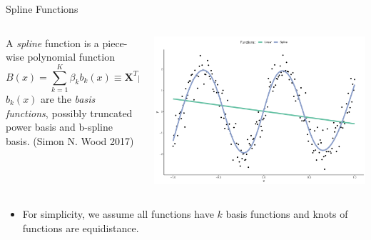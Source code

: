 \documentclass[
  ignorenonframetext,
  aspectratio=169]{beamer}
\providecommand{\tightlist}{%
  \setlength{\itemsep}{0pt}\setlength{\parskip}{0pt}}
\newcommand{\bs}[1]{\boldsymbol{#1}}
\begin{document}
\begin{frame}{Spline Functions}
\protect\hypertarget{spline-functions}{}
\begin{columns}[T]
\begin{column}{0.48\textwidth}
A \emph{spline} function is a piece-wise polynomial function \[
B(x) = \sum\limits_{k = 1}^K \beta_k b_k(x) \equiv  \bs X^T \bs \beta
\] \(b_k(x)\) are the \emph{basis functions}, possibly truncated power
basis and b-spline basis. (Simon N. Wood 2017)
\end{column}

\begin{column}{0.48\textwidth}
\includegraphics{phd_defense_slides_files/figure-beamer/plot1-1.pdf}
\end{column}
\end{columns}

\begin{itemize}
\tightlist
\item
  For simplicity, we assume all functions have \(k\) basis functions and
  knots of functions are equidistance.
\end{itemize}
\end{frame}
\end{document}
